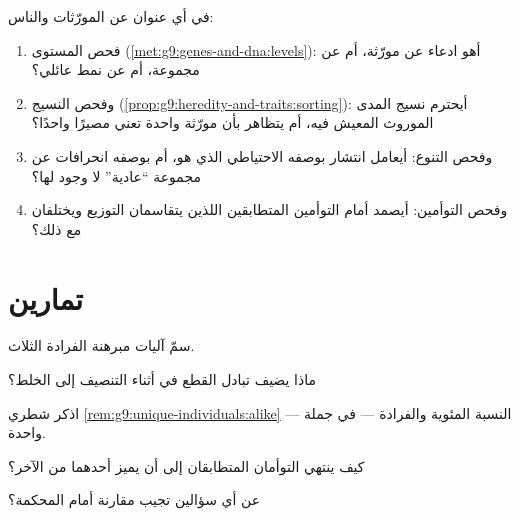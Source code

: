 \begin{method}\label{met:g9:unique-individuals:claims}
في أي عنوان عن المورّثات والناس:
\begin{enumerate}
  \item فحص المستوى
        (\cref{met:g9:genes-and-dna:levels}): أهو ادعاء
        عن مورّثة، أم عن مجموعة، أم عن نمط عائلي؟
  \item وفحص النسيج
        (\cref{prop:g9:heredity-and-traits:sorting}):
        أيحترم نسيج المدى الموروث المعيش فيه، أم يتظاهر
        بأن مورّثة واحدة تعني مصيرًا واحدًا؟
  \item وفحص التنوع: أيعامل انتشار  بوصفه
        الاحتياطي الذي هو، أم بوصفه انحرافات عن مجموعة
        ``عادية'' لا وجود لها؟
  \item وفحص التوأمين: أيصمد أمام التوأمين المتطابقين
        اللذين يتقاسمان التوزيع ويختلفان مع ذلك؟
\end{enumerate}
\end{method}

\section{تمارين}

\begin{exercise}[$\star$]\label{exo:g9:unique-individuals:1}
سمّ آليات مبرهنة الفرادة الثلاث.
\end{exercise}

\begin{exercise}[$\star$]\label{exo:g9:unique-individuals:2}
ماذا يضيف تبادل القطع في أثناء التنصيف إلى الخلط؟
\end{exercise}

\begin{exercise}[$\star$]\label{exo:g9:unique-individuals:3}
اذكر شطري \cref{rem:g9:unique-individuals:alike} ---
النسبة المئوية والفرادة --- في جملة واحدة.
\end{exercise}

\begin{exercise}[$\star$]\label{exo:g9:unique-individuals:4}
كيف ينتهي التوأمان المتطابقان إلى أن يميز أحدهما من الآخر؟
\end{exercise}

\begin{exercise}[$\star$]\label{exo:g9:unique-individuals:5}
عن أي سؤالين تجيب مقارنة  أمام المحكمة؟
\end{exercise}

